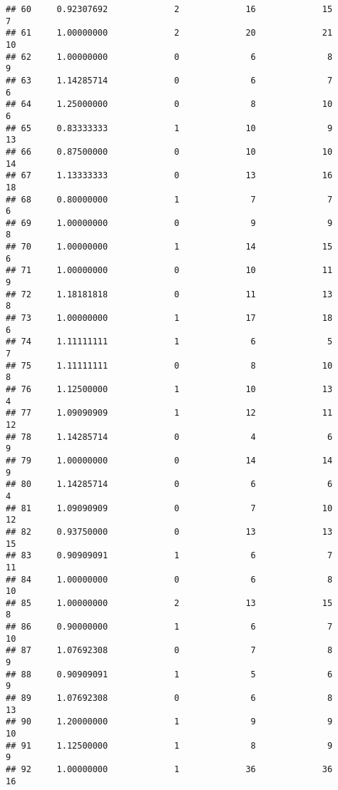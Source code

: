 \documentclass[
]{article}
\begin{document}
\begin{verbatim}
## 60     0.92307692             2             16             15              7
## 61     1.00000000             2             20             21             10
## 62     1.00000000             0              6              8              9
## 63     1.14285714             0              6              7              6
## 64     1.25000000             0              8             10              6
## 65     0.83333333             1             10              9             13
## 66     0.87500000             0             10             10             14
## 67     1.13333333             0             13             16             18
## 68     0.80000000             1              7              7              6
## 69     1.00000000             0              9              9              8
## 70     1.00000000             1             14             15              6
## 71     1.00000000             0             10             11              9
## 72     1.18181818             0             11             13              8
## 73     1.00000000             1             17             18              6
## 74     1.11111111             1              6              5              7
## 75     1.11111111             0              8             10              8
## 76     1.12500000             1             10             13              4
## 77     1.09090909             1             12             11             12
## 78     1.14285714             0              4              6              9
## 79     1.00000000             0             14             14              9
## 80     1.14285714             0              6              6              4
## 81     1.09090909             0              7             10             12
## 82     0.93750000             0             13             13             15
## 83     0.90909091             1              6              7             11
## 84     1.00000000             0              6              8             10
## 85     1.00000000             2             13             15              8
## 86     0.90000000             1              6              7             10
## 87     1.07692308             0              7              8              9
## 88     0.90909091             1              5              6              9
## 89     1.07692308             0              6              8             13
## 90     1.20000000             1              9              9             10
## 91     1.12500000             1              8              9              9
## 92     1.00000000             1             36             36             16

\end{verbatim}
\end{document}
